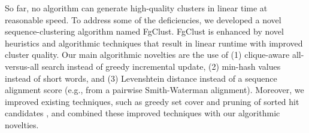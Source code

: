 \documentclass[11pt,letterpaper]{article}
\begin{document}


So far, no algorithm can generate high-quality clusters in linear time at reasonable speed.
To address some of the deficiencies,  we developed a novel sequence-clustering algorithm named FgClust.
FgClust is enhanced by novel heuristics and algorithmic techniques that result in linear runtime with improved cluster quality.
Our main algorithmic novelties are the use of (1) clique-aware all-versus-all search instead of greedy incremental update, (2) min-hash values instead of short words, and (3) Levenshtein distance instead of a sequence alignment score (e.g., from a pairwise Smith-Waterman alignment). Moreover, we improved existing techniques, such as greedy set cover \cite{steinegger2017mmseqs2} and pruning of sorted hit candidates \cite{edgar2010search}, and combined these improved techniques with our algorithmic novelties.

%
\end{document}
